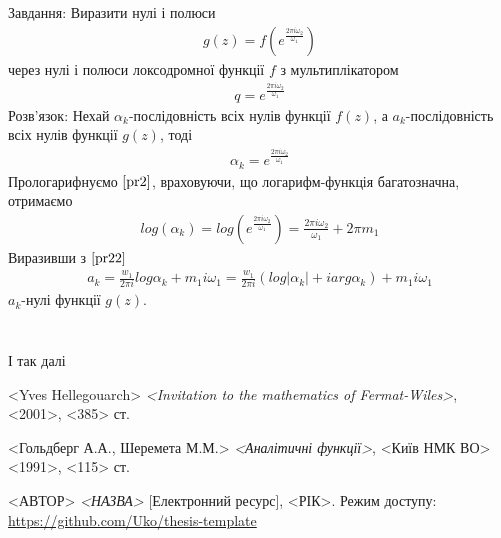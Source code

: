 \documentclass[12pt,a4paper]{article}
\begin{document}
\begin{pryk}
Завдання: Виразити нулі і полюси
\[\begin{array}{l}
g(z)=f(e^{\frac{2\pi i \omega_{2} }{\omega_{1}}})
\end{array}\]
через нулі і полюси локсодромної функції $f$ з мультиплікатором 
\[\begin{array}{l}
q=e^{\frac{2\pi i \omega_{2} }{\omega_{1}}}
\end{array}\]
Розв'язок: Нехай $\alpha_{k} $-послідовність всіх нулів функції $f(z)$, а $a_{k}$-послідовність всіх нулів функції $g(z)$, тоді
\begin{equation}\label{pr2}
\begin{array}{l}
\alpha_{k}=e^{\frac{2\pi i \omega_{2} }{\omega_{1}}}
\end{array}
\end{equation}
Прологарифнуємо $\eqref{pr2}$, враховуючи, що логарифм-функція багатозначна, отримаємо
\begin{equation}\label{pr22}
\begin{array}{l}
log(\alpha_{k})=log(e^{\frac{2\pi i \omega_{2} }{\omega_{1}}})= \frac{2\pi i \omega_{2} }{\omega_{1}}+ 2\pi m_{1} 
\end{array}
\end{equation}
Виразивши з $\eqref{pr22}$ 
\[\begin{array}{l}
a_{k}=\frac{w_{1}}{2\pi i}log\alpha_{k} + m_{1}i\omega_{1}=\frac{w_{1}}{2\pi i}(log\vert\alpha_{k}\vert + iarg\alpha_{k})+m_{1}i\omega_{1}
\end{array}\]
$a_{k}$-нулі функції $g(z)$.
\end{pryk}
\[\begin{array}{l}
\end{array}\]

\begin{pryk}

\end{pryk}
\[\begin{array}{l}
\end{array}\]
І так далі\cite{web}



\clearpage
{}
\begin{thebibliography}{9}

  <Yves Hellegouarch> \emph{<Invitation to the mathematics of Fermat-Wiles>},
    <2001>, <385> ст.
    
  <Гольдберг А.А., Шеремета М.М.> \emph{<Аналітичні функції>},
    <Київ НМК ВО> <1991>, <115> ст.
      
  <АВТОР> \emph{<НАЗВА>} [Електронний ресурс],
    <РІК>. Режим доступу:
    \url{https://github.com/Uko/thesis-template}

\end{thebibliography}
\end{document}
